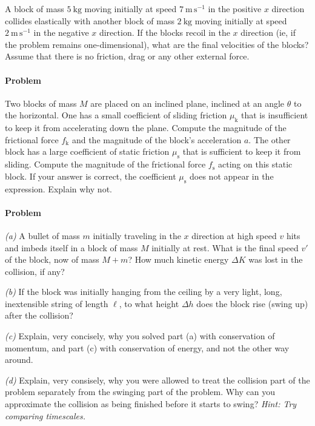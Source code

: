\documentclass[12pt]{article}
\newcounter{problem}
\begin{document}
A block of mass $5~\mathrm{kg}$ moving initially at speed
$7~\mathrm{m\,s^{-1}}$ in the positive $x$ direction collides
elastically with another block of mass $2~\mathrm{kg}$ moving
initially at speed $2~\mathrm{m\,s^{-1}}$ in the negative $x$
direction.  If the blocks recoil in the $x$ direction (ie, if the
problem remains one-dimensional), what are the final velocities of the
blocks?  Assume that there is no friction, drag or any other external
force.

\paragraph{Problem~\theproblem}

Two blocks of mass $M$ are placed on an inclined plane, inclined at an
angle $\theta$ to the horizontal.  One has a small coefficient of
sliding friction $\mu_\mathrm{k}$ that is insufficient to keep it from
accelerating down the plane.  Compute the magnitude of the frictional
force $f_\mathrm{k}$ and the magnitude of the block's acceleration
$a$.  The other block has a large coefficient of static friction
$\mu_\mathrm{s}$ that is sufficient to keep it from sliding.  Compute
the magnitude of the frictional force $f_\mathrm{s}$ acting on this
static block.  If your answer is correct, the coefficient
$\mu_\mathrm{s}$ does not appear in the expression.  Explain why not.

\paragraph{Problem~\theproblem}

\textsl{(a)} A bullet of mass $m$ initially traveling in the $x$
direction at high speed $v$ hits and imbeds itself in a block of mass
$M$ initially at rest.  What is the final speed $v'$ of the block,
now of mass $M+m$?  How much kinetic energy $\Delta K$ was lost in the
collision, if any?

\textsl{(b)} If the block was initially hanging from the ceiling by a
very light, long, inextensible string of length $\ell$, to what height
$\Delta h$ does the block rise (swing up) after the collision?

\textsl{(c)} Explain, very concisely, why you solved part (a) with
conservation of momentum, and part (c) with conservation of energy,
and not the other way around.

\textsl{(d)} Explain, very consisely, why you were allowed to treat
the collision part of the problem separately from the swinging part of
the problem.  Why can you approximate the collision as being finished
before it starts to swing?  \textit{Hint: Try comparing timescales.}
\end{document}
